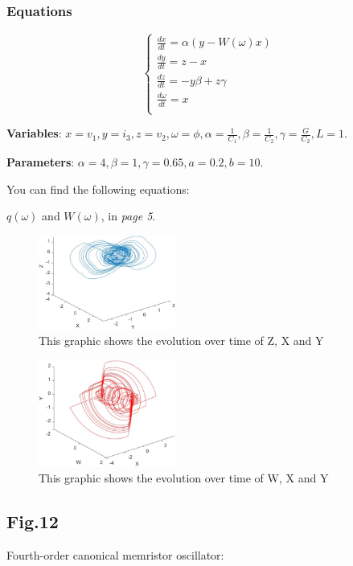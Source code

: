 \documentclass[12pt, a4paper]{paper}
\begin{document}
\subsubsection{Equations}
\begin{equation}
\begin{cases}
\frac{dx}{dt}=\alpha(y-W(\omega)x) 
\\
\frac{dy}{dt}=z-x
\\
\frac{dz}{dt}=-y\beta+z\gamma
\\
\frac{d\omega}{dt}=x
\\
\end{cases}
\end{equation}

\textbf{Variables}: $x=v_1, y=i_3, z=v_2, \omega=\phi, \alpha=\frac{1}{C_1},
\beta=\frac{1}{C_2}, \gamma=\frac{G}{C_2}, L=1$.

\textbf{Parameters}: $\alpha =4, \beta =1, \gamma =0.65, a=0.2, b=10$.

You can find the following equations:

$q(\omega)$ and $W(\omega)$, in \textit{page 5}.

\begin{figure}[h]
\centering
\includegraphics[width=0.4\textwidth]{Fig_10_1.eps}
\caption{This graphic shows the evolution over time of Z, X and Y}
\end{figure}

\begin{figure}[h]
\centering
\includegraphics[width=0.4\textwidth]{Fig_10_2.eps}
\caption{This graphic shows the evolution over time of W, X and Y}
\end{figure}

\newpage
\subsection{Fig.12}
Fourth-order canonical memristor oscillator:
\end{document}
